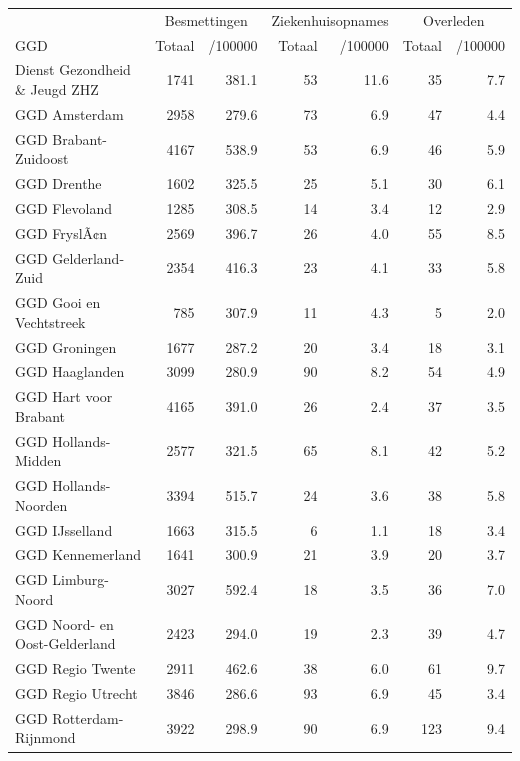 \documentclass[
  english,
  man,floatsintext]{apa6}
\begin{document}
\begin{table}[H]
\centering\begingroup\fontsize{10}{12}\selectfont

\begin{threeparttable}
\begin{tabular}{lrrrrrr}
\toprule
\multicolumn{1}{c}{ } & \multicolumn{2}{c}{Besmettingen} & \multicolumn{2}{c}{Ziekenhuisopnames} & \multicolumn{2}{c}{Overleden} \\
\cmidrule(l{3pt}r{3pt}){2-3} \cmidrule(l{3pt}r{3pt}){4-5} \cmidrule(l{3pt}r{3pt}){6-7}
GGD & Totaal & /100000 & Totaal & /100000 & Totaal & /100000\\
\midrule
Dienst Gezondheid \& Jeugd ZHZ & 1741 & 381.1 & 53 & 11.6 & 35 & 7.7\\
GGD Amsterdam & 2958 & 279.6 & 73 & 6.9 & 47 & 4.4\\
GGD Brabant-Zuidoost & 4167 & 538.9 & 53 & 6.9 & 46 & 5.9\\
GGD Drenthe & 1602 & 325.5 & 25 & 5.1 & 30 & 6.1\\
GGD Flevoland & 1285 & 308.5 & 14 & 3.4 & 12 & 2.9\\
GGD FryslÃ¢n & 2569 & 396.7 & 26 & 4.0 & 55 & 8.5\\
GGD Gelderland-Zuid & 2354 & 416.3 & 23 & 4.1 & 33 & 5.8\\
GGD Gooi en Vechtstreek & 785 & 307.9 & 11 & 4.3 & 5 & 2.0\\
GGD Groningen & 1677 & 287.2 & 20 & 3.4 & 18 & 3.1\\
GGD Haaglanden & 3099 & 280.9 & 90 & 8.2 & 54 & 4.9\\
GGD Hart voor Brabant & 4165 & 391.0 & 26 & 2.4 & 37 & 3.5\\
GGD Hollands-Midden & 2577 & 321.5 & 65 & 8.1 & 42 & 5.2\\
GGD Hollands-Noorden & 3394 & 515.7 & 24 & 3.6 & 38 & 5.8\\
GGD IJsselland & 1663 & 315.5 & 6 & 1.1 & 18 & 3.4\\
GGD Kennemerland & 1641 & 300.9 & 21 & 3.9 & 20 & 3.7\\
GGD Limburg-Noord & 3027 & 592.4 & 18 & 3.5 & 36 & 7.0\\
GGD Noord- en Oost-Gelderland & 2423 & 294.0 & 19 & 2.3 & 39 & 4.7\\
GGD Regio Twente & 2911 & 462.6 & 38 & 6.0 & 61 & 9.7\\
GGD Regio Utrecht & 3846 & 286.6 & 93 & 6.9 & 45 & 3.4\\
GGD Rotterdam-Rijnmond & 3922 & 298.9 & 90 & 6.9 & 123 & 9.4\\

\end{tabular}
\end{threeparttable}
\end{table}
\end{document}
